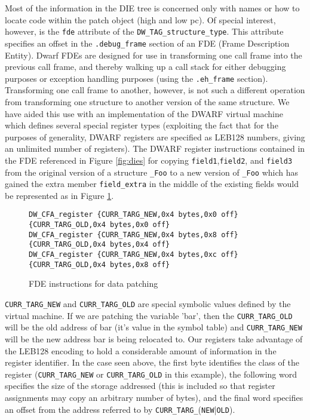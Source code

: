 \documentclass[a4paper,12pt]{article}
\begin{document}
Most of the information in the DIE tree is concerned only with names
or how to locate code within the patch object (high and low pc). Of
special interest, however, is the \texttt{fde} attribute of the
\texttt{DW\_TAG\_structure\_type}. This attribute specifies an offset
in the \texttt{.debug\_frame} section of an FDE (Frame Description
Entity). Dwarf FDEs are designed for use in transforming one call
frame into the previous call frame, and thereby walking up a call
stack for either debugging purposes or exception handling purposes
(using the \texttt{.eh\_frame} section). Transforming one call frame
to another, however, is not such a different operation from
transforming one structure to another version of the same
structure. We have aided this use with an implementation of the DWARF
virtual machine which defines several special register types
(exploiting the fact that for the purposes of generality, DWARF
registers are specified as LEB128 numbers, giving an unlimited number
of registers). The DWARF register instructions contained in the FDE
referenced in Figure \ref{fig:dies} for copying \texttt{field1},\texttt{field2}, and
\texttt{field3} from the original version of a structure \texttt{\_Foo}
to a new version of \texttt{\_Foo} which has gained the extra member
\texttt{field\_extra} in the middle of the existing fields would be
represented as in Figure \ref{fig:fdeinstrs}.
\begin{figure}[hb]
{\footnotesize
\begin{verbatim}
DW_CFA_register {CURR_TARG_NEW,0x4 bytes,0x0 off} {CURR_TARG_OLD,0x4 bytes,0x0 off} 
DW_CFA_register {CURR_TARG_NEW,0x4 bytes,0x8 off} {CURR_TARG_OLD,0x4 bytes,0x4 off} 
DW_CFA_register {CURR_TARG_NEW,0x4 bytes,0xc off} {CURR_TARG_OLD,0x4 bytes,0x8 off} 
\end{verbatim}
}
\caption{FDE instructions for data patching}
\label{fig:fdeinstrs}
\end{figure}

\texttt{CURR\_TARG\_NEW} and \texttt{CURR\_TARG\_OLD} are special
symbolic values defined by the virtual machine. If we are patching the
variable 'bar', then the \texttt{CURR\_TARG\_OLD} will be the old address of bar
(it's value in the symbol table) and \texttt{CURR\_TARG\_NEW} will be the new
address bar is being relocated to. Our registers take advantage of the
LEB128 encoding to hold a considerable amount of information in the
register identifier. In the case seen above, the first byte identifies
the class of the register (\texttt{CURR\_TARG\_NEW} or \texttt{CURR\_TARG\_OLD} in this
example), the following word specifies the size of the storage
addressed (this is included so that register assignments may copy an
arbitrary number of bytes), and the final word specifies an offset
from the address referred to by \texttt{CURR\_TARG\_}(\texttt{NEW}|\texttt{OLD}).
\end{document}
